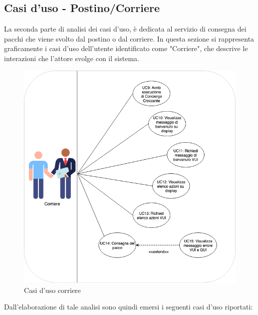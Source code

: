 \subsection{Casi d'uso - Postino/Corriere}
La seconda parte di analisi dei casi d'uso, è dedicata al servizio di consegna dei pacchi che viene svolto dal postino o dal corriere. In questa sezione si rappresenta graficamente i casi d'uso dell'utente identificato come "Corriere", che descrive le interazioni che l'attore svolge con il sistema.
\begin{figure}[H] 
    \centering 
    \includegraphics[width=1\columnwidth]{immagini/casi_duso3.png}
    \caption{\label{fig:attori}Casi d'uso corriere}
\end{figure}
Dall'elaborazione di tale analisi sono quindi emersi i seguenti casi d'uso riportati:
